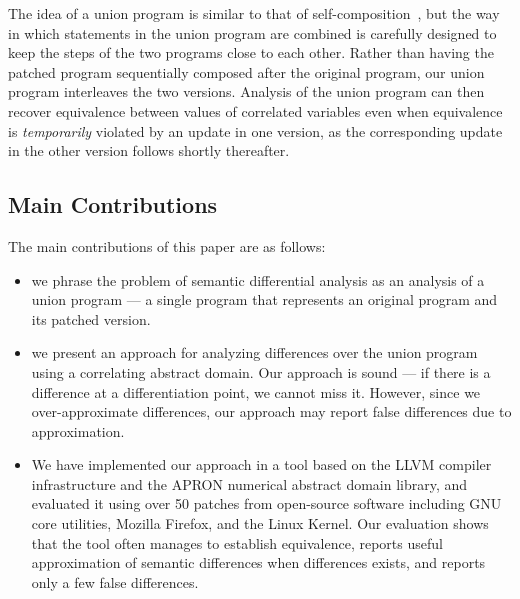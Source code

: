 The idea of a union program is similar to that of self-composition~\cite{BartheDArgenioRezk04,AikenTerauchi05}, but the way in which statements in the union program are combined is carefully designed to keep the steps of the two programs close to each other. Rather than having the patched program sequentially composed after the original program, our union program interleaves the two versions. Analysis of the union program can then recover equivalence between values of correlated variables even when equivalence is \emph{temporarily} violated by an update in one version, as the corresponding update in the other version follows shortly thereafter.




\subsection{Main Contributions} 
The main contributions of this paper are as follows:
\begin{itemize}
\item we phrase the problem of semantic differential analysis as an analysis of a union program --- a single program that represents an original program and its patched version.
\item we present an approach for analyzing differences over the union program using a correlating abstract domain. Our approach is sound --- if there is a difference at a differentiation point, we cannot miss it. However, since we over-approximate differences, our approach may report false differences due to approximation.
\item We have implemented our approach in a tool based on the LLVM compiler infrastructure and the APRON numerical abstract domain library, and evaluated it using over 50 patches from open-source software including GNU core utilities, Mozilla Firefox, and the Linux Kernel. Our evaluation shows that the tool often manages to establish equivalence, reports useful approximation of semantic differences when differences exists, and reports only a few false differences.
\end{itemize}


